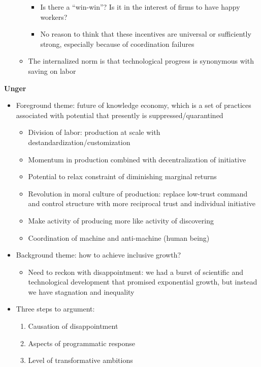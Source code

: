 \begin{itemize}
\begin{itemize}
    \begin{itemize}
    \tightlist
    \item
      Is there a ``win-win''? Is it in the interest of firms to have
      happy workers?
    \item
      No reason to think that these incentives are universal or
      sufficiently strong, especially because of coordination failures
    \end{itemize}
  \item
    The internalized norm is that technological progress is synonymous
    with saving on labor
  \end{itemize}
\end{itemize}

\textbf{Unger}

\begin{itemize}
\tightlist
\item
  Foreground theme: future of knowledge economy, which is a set of
  practices associated with potential that presently is
  suppressed/quarantined

  \begin{itemize}
  \tightlist
  \item
    Division of labor: production at scale with
    destandardization/customization
  \item
    Momentum in production combined with decentralization of initiative
  \item
    Potential to relax constraint of diminishing marginal returns
  \item
    Revolution in moral culture of production: replace low-trust command
    and control structure with more reciprocal trust and individual
    initiative
  \item
    Make activity of producing more like activity of discovering
  \item
    Coordination of machine and anti-machine (human being)
  \end{itemize}
\item
  Background theme: how to achieve inclusive growth?

  \begin{itemize}
  \tightlist
  \item
    Need to reckon with disappointment: we had a burst of scientific and
    technological development that promised exponential growth, but
    instead we have stagnation and inequality
  \end{itemize}
\item
  Three steps to argument:

  \begin{enumerate}
  \def\labelenumi{\arabic{enumi}.}
  \tightlist
  \item
    Causation of disappointment
  \item
    Aspects of programmatic response
  \item
    Level of transformative ambitions
  \end{enumerate}
\end{itemize}

